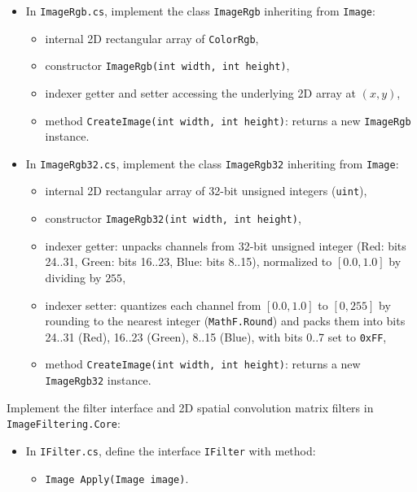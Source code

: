 \documentclass[11pt,a4paper,addpoints]{exam}
\begin{document}
\begin{questions}
\begin{itemize}
    \item In \texttt{ImageRgb.cs}, implement the class \texttt{ImageRgb} inheriting from \texttt{Image}:
    \begin{itemize}
        \item internal 2D rectangular array of \texttt{ColorRgb},
        \item constructor \texttt{ImageRgb(int width, int height)},
        \item indexer getter and setter accessing the underlying 2D array at $(x, y)$,
        \item method \texttt{CreateImage(int width, int height)}: returns a new \texttt{ImageRgb} instance.
    \end{itemize}

    \item In \texttt{ImageRgb32.cs}, implement the class \texttt{ImageRgb32} inheriting from \texttt{Image}:
    \begin{itemize}
        \item internal 2D rectangular array of 32-bit unsigned integers (\texttt{uint}),
        \item constructor \texttt{ImageRgb32(int width, int height)},
        \item indexer getter: unpacks channels from 32-bit unsigned integer (Red: bits 24..31, Green: bits 16..23, Blue: bits 8..15), normalized to $[0.0, 1.0]$ by dividing by $255$,
        \item indexer setter: quantizes each channel from $[0.0, 1.0]$ to $[0, 255]$ by rounding to the nearest integer (\texttt{MathF.Round}) and packs them into bits 24..31 (Red), 16..23 (Green), 8..15 (Blue), with bits 0..7 set to \texttt{0xFF},
        \item method \texttt{CreateImage(int width, int height)}: returns a new \texttt{ImageRgb32} instance.
    \end{itemize}
\end{itemize}

\question[4]
Implement the filter interface and 2D spatial convolution matrix filters in \texttt{ImageFiltering.Core}:
\begin{itemize}
    \item In \texttt{IFilter.cs}, define the interface \texttt{IFilter} with method:
    \begin{itemize}
        \item \texttt{Image Apply(Image image)}.
    \end{itemize}


\end{itemize}
\end{questions}
\end{document}
